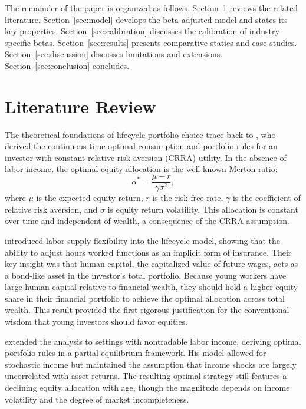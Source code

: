 \documentclass[11pt]{article}
\begin{document}
The remainder of the paper is organized as follows. Section~\ref{sec:lit}
reviews the related literature. Section~\ref{sec:model} develops the
beta-adjusted model and states its key properties.
Section~\ref{sec:calibration} discusses the calibration of industry-specific
betas. Section~\ref{sec:results} presents comparative statics and case
studies. Section~\ref{sec:discussion} discusses limitations and extensions.
Section~\ref{sec:conclusion} concludes.


\section{Literature Review}\label{sec:lit}

The theoretical foundations of lifecycle portfolio choice trace back to
\citet{merton1969, merton1971}, who derived the continuous-time optimal
consumption and portfolio rules for an investor with constant relative risk
aversion (CRRA) utility. In the absence of labor income, the optimal equity
allocation is the well-known Merton ratio:
\begin{equation}\label{eq:merton}
  \alpha^{*} = \frac{\mu - r}{\gamma \sigma^2},
\end{equation}
where $\mu$ is the expected equity return, $r$ is the risk-free rate,
$\gamma$ is the coefficient of relative risk aversion, and $\sigma$ is
equity return volatility. This allocation is constant over time and
independent of wealth, a consequence of the CRRA assumption.

\citet{bodie1992} introduced labor supply flexibility into the lifecycle
model, showing that the ability to adjust hours worked functions as an
implicit form of insurance. Their key insight was that human capital, the
capitalized value of future wages, acts as a bond-like asset in the
investor's total portfolio. Because young workers have large human capital
relative to financial wealth, they should hold a higher equity share in
their financial portfolio to achieve the optimal allocation across total
wealth. This result provided the first rigorous justification for the
conventional wisdom that young investors should favor equities.

\citet{viceira2001} extended the analysis to settings with nontradable
labor income, deriving optimal portfolio rules in a partial equilibrium
framework. His model allowed for stochastic income but maintained the
assumption that income shocks are largely uncorrelated with asset returns.
The resulting optimal strategy still features a declining equity allocation
with age, though the magnitude depends on income volatility and the degree
of market incompleteness.
\end{document}
